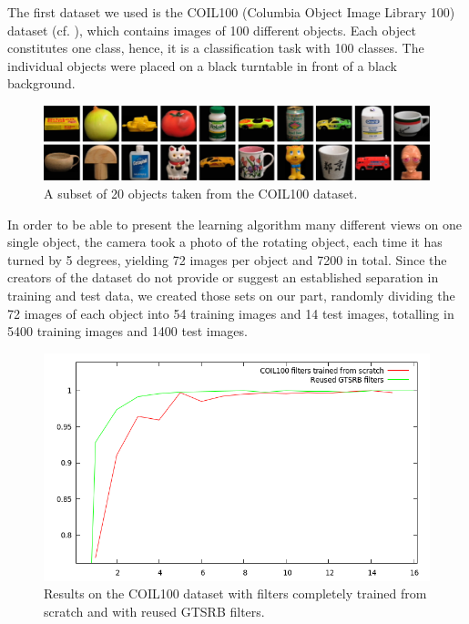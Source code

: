 \documentclass[11pt, a4paper]{article}
\begin{document}
The first dataset we used is the COIL100 (Columbia Object Image Library 100) dataset (cf. \cite{columbia_object_image_library}), which contains images of 100 different objects. Each object constitutes one class, hence, it is a classification task with 100 classes. The individual objects were placed on a black turntable in front of a black background. 
\begin{figure}[h!]
	\centering
	\includegraphics[width=1\textwidth]{coil100}
	\caption{A subset of 20 objects taken from the COIL100 dataset.}
	\label{fig:coil100_objects}
\end{figure}
In order to be able to present the learning algorithm many different views on one single object, the camera took a photo of the rotating object, each time it has turned by 5 degrees, yielding 72 images per object and 7200 in total. Since the creators of the dataset do not provide or suggest an established separation in training and test data, we created those sets on our part, randomly dividing the 72 images of each object into 54 training images and 14 test images, totalling in 5400 training images and 1400 test images.

\begin{figure}[h!]
	\centering
	\includegraphics[width=1\textwidth]{coil100_results.png}
	\caption{Results on the COIL100 dataset with filters completely trained from scratch and with reused GTSRB filters.}
	\label{fig:coil100_results}
\end{figure}
\end{document}
